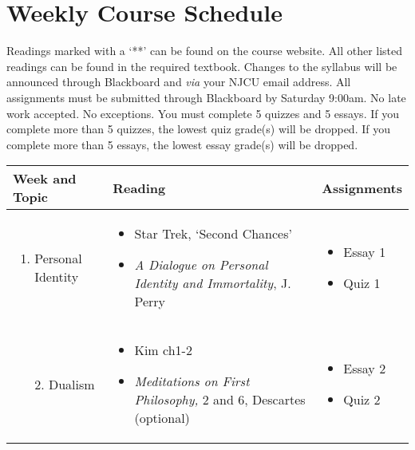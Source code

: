 \documentclass[article,oneside]{memoir}
\begin{document}
\section{Weekly Course Schedule}
Readings marked with a `**' can be found on the course website. All other listed readings can be found in the required textbook. Changes to the syllabus will be announced through Blackboard and \emph{via} your NJCU email address.  All assignments must be submitted through Blackboard by Saturday 9:00am. No late work accepted. No exceptions. You must complete 5 quizzes and 5 essays.  If you complete more than 5 quizzes, the lowest quiz grade(s) will be dropped. If you complete more than 5 essays, the lowest essay grade(s) will be dropped.   \newline

\begin{centering}

 \begin{tabular}{| p{4cm} | p{7cm} | p{3cm} |}  \hline
 Week and Topic   & Reading &  Assignments \\  \hline

\begin{enumerate} \item Personal Identity \end{enumerate}
&  \begin{itemize} \item Star Trek, `Second Chances'  \item  \emph{A Dialogue on Personal Identity and Immortality}, J. Perry  \end{itemize}  
& \begin{itemize}  \item Essay 1 \item Quiz 1 \end{itemize} \\  

\begin{enumerate} \item[2.] Dualism \end{enumerate}
&\begin{itemize} \item Kim ch1-2  \item \emph{Meditations on First Philosophy,} 2 and 6,  Descartes (optional) \end{itemize}   
& \begin{itemize}  \item Essay 2 \item Quiz 2 \end{itemize} \\  


\end{tabular}
\end{centering}
\end{document}

